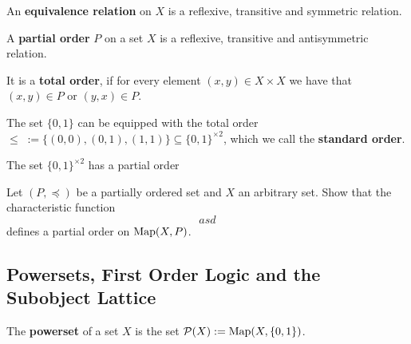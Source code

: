 \documentclass{article}
\begin{document}

	\begin{definition}
		An \textbf{equivalence relation} on $X$ is a reflexive, transitive and symmetric relation.
	\end{definition}



	\begin{definition}
		A \textbf{partial order} $P$ on a set $X$ is a reflexive, transitive and antisymmetric relation. 

		It is a \textbf{total order}, if for every element $(x,y) \in X\times X$ we have that $(x,y)\in P$ or $(y,x) \in P$.
	\end{definition}

	\begin{example}
		The set $\{0,1\}$ can be equipped with the total order $\leq\; := \{(0,0),(0,1),(1,1)\} \subseteq \{0,1\}^{\times 2}$, which we call the \textbf{standard order}. 
	\end{example}
	\begin{example}
		The set $\{0,1\}^{\times 2}$ has a partial order \TODO{grid and lexicographic}
	\end{example}

	\begin{exercise}
		\label{excMapsIntoPoset}
		Let $(P,\preceq)$ be a partially ordered set and $X$ an arbitrary set. Show that the characteristic function
		\begin{equation*}
			asd
		\end{equation*}
		defines a partial order on $\operatorname{Map}(X,P)$.
	\end{exercise}


	\newpage
	\subsection{Powersets, First Order Logic and the Subobject Lattice}


	\begin{definition}
		The \textbf{powerset} of a set $X$ is the set $\mathcal{P}(X) := \operatorname{Map}(X,\{0,1\})$.
	\end{definition}
\end{document}

